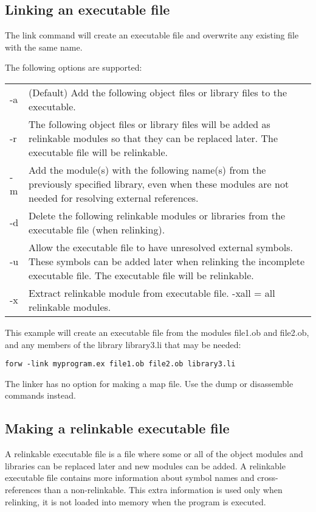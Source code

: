 \documentclass[forwardcom.tex]{subfiles}
\begin{document}
\subsection{Linking an executable file} \label{linking}
The link command will create an executable file and overwrite any existing file with the same name.
\vspace{2mm}

The following options are supported:\\
\begin{tabular}{|p{10mm}p{150mm}|}
\hline
-a & (Default) Add the following object files or library files to the executable.\\
-r & The following object files or library files will be added as relinkable modules so that they can be replaced later. The executable file will be relinkable.\\
-m & Add the module(s) with the following name(s) from the previously specified library, even when 
these modules are not needed for resolving external references.\\
-d & Delete the following relinkable modules or libraries from the executable file (when relinking).\\
-u & Allow the executable file to have unresolved external symbols. These symbols can be added later when relinking the incomplete executable file. The executable file will be relinkable.\\ 
-x & Extract relinkable module from executable file. -xall = all relinkable modules.\\
\hline
\end{tabular}
\vspace{2mm}

This example will create an executable file from the modules file1.ob and file2.ob, and any members of the library library3.li that may be needed:
\begin{lstlisting}[frame=single]
forw -link myprogram.ex file1.ob file2.ob library3.li
\end{lstlisting}
\vspace{4mm}

The linker has no option for making a map file. Use the dump or disassemble commands instead.
\vspace{2mm}


\subsection{Making a relinkable executable file} \label{makingARelinkableExecutableFile}
A relinkable executable file is a file where some or all of the object modules and libraries can be replaced later and new modules can be added. A relinkable executable file contains more information about symbol names and cross-references than a non-relinkable. This extra information is used only when relinking, it is not loaded into memory when the program is executed.
\vspace{2mm}
\end{document}
